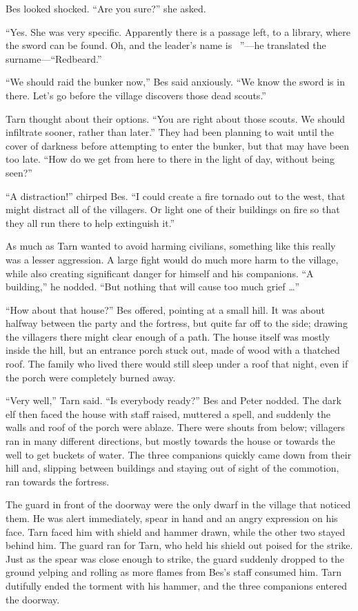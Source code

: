 Bes looked shocked.  ``Are you sure?'' she asked.

``Yes.  She was very specific.  Apparently there is a passage left, to a library, where the sword can be found.  Oh, and the leader's name is \mothzam\ \driktur''---he translated the surname---``Redbeard.''

``We should raid the bunker now,'' Bes said anxiously.  ``We know the sword is in there.  Let's go before the village discovers those dead scouts.''

Tarn thought about their options.  ``You are right about those scouts.  We should infiltrate sooner, rather than later.''  They had been planning to wait until the cover of darkness before attempting to enter the bunker, but that may have been too late.  ``How do we get from here to there in the light of day, without being seen?''

``A distraction!'' chirped Bes.  ``I could create a fire tornado out to the west, that might distract all of the villagers.  Or light one of their buildings on fire so that they all run there to help extinguish it.''

As much as Tarn wanted to avoid harming civilians, something like this really was a lesser aggression.  A large fight would do much more harm to the village, while also creating significant danger for himself and his companions.  ``A building,'' he nodded.  ``But nothing that will cause too much grief \ldots''

``How about that house?'' Bes offered, pointing at a small hill.  It was about halfway between the party and the fortress, but quite far off to the side; drawing the villagers there might clear enough of a path.  The house itself was mostly inside the hill, but an entrance porch stuck out, made of wood with a thatched roof.  The family who lived there would still sleep under a roof that night, even if the porch were completely burned away.

``Very well,'' Tarn said. ``Is everybody ready?''  Bes and Peter nodded.  The dark elf then faced the house with staff raised, muttered a spell, and suddenly the walls and roof of the porch were ablaze.  There were shouts from below; villagers ran in many different directions, but mostly towards the house or towards the well to get buckets of water.  The three companions quickly came down from their hill and, slipping between buildings and staying out of sight of the commotion, ran towards the fortress.

The guard in front of the doorway were the only dwarf in the village that noticed them.  He was alert immediately, spear in hand and an angry expression on his face.  Tarn faced him with shield and hammer drawn, while the other two stayed behind him.  The guard ran for Tarn, who held his shield out poised for the strike.  Just as the spear was close enough to strike, the guard suddenly dropped to the ground yelping and rolling as more flames from Bes's staff consumed him.  Tarn dutifully ended the torment with his hammer, and the three companions entered the doorway.